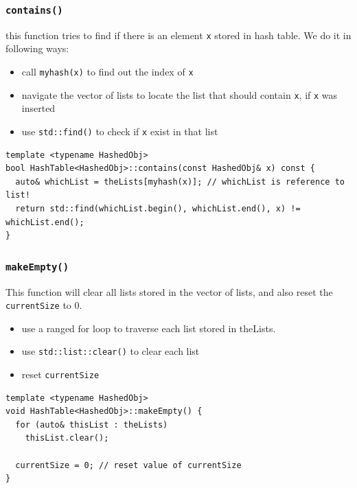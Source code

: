 \documentclass[11pt]{book}
\begin{document}
\subsubsection{\texttt{contains()}}
\label{sec:org92aa78c}
this function tries to find if there is an element \texttt{x} stored in hash table. We do it in following ways:
\begin{itemize}
\item call \texttt{myhash(x)} to find out the index of \texttt{x}
\item navigate the vector of lists to locate the list that should contain \texttt{x}, if \texttt{x} was inserted
\item use \texttt{std::find()} to check if \texttt{x} exist in that list
\end{itemize}
\begin{verbatim}
template <typename HashedObj>
bool HashTable<HashedObj>::contains(const HashedObj& x) const {
  auto& whichList = theLists[myhash(x)]; // whichList is reference to list!
  return std::find(whichList.begin(), whichList.end(), x) != whichList.end();
}
\end{verbatim}

\subsubsection{\texttt{makeEmpty()}}
\label{sec:org7287433}
This function will clear all lists stored in the vector of lists, and also reset the \texttt{currentSize} to 0.
\begin{itemize}
\item use a ranged for loop to traverse each list stored in theLists.
\item use \texttt{std::list::clear()} to clear each list
\item reset \texttt{currentSize}
\end{itemize}
\begin{verbatim}
template <typename HashedObj>
void HashTable<HashedObj>::makeEmpty() {
  for (auto& thisList : theLists)
    thisList.clear();

  currentSize = 0; // reset value of currentSize
}
\end{verbatim}
\end{document}
